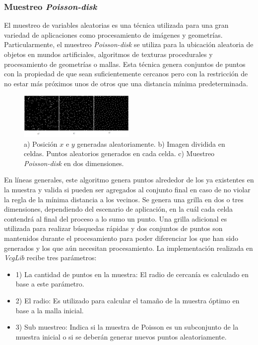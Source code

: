 \subsubsection{Muestreo \emph{Poisson-disk}}

El muestreo de variables aleatorias es una técnica utilizada para una gran variedad de aplicaciones como procesamiento de imágenes y geometrías. Particularmente, el muestreo \emph{Poisson-disk} se utiliza para la ubicación aleatoria de objetos en mundos artificiales, algoritmos de texturas procedurales y procesamiento de geometrías o mallas. Esta técnica genera conjuntos de puntos con la propiedad de que sean suficientemente cercanos pero con la restricción de no estar más próximos unos de otros que una distancia mínima predeterminada.

\begin{figure}[H]
  \centering
    \includegraphics[width=0.5\textwidth]{./Cap2_videomapping/malla-poisson.png}
  \caption{a) Posición $x$ e $y$ generadas aleatoriamente. b) Imagen dividida en celdas. Puntos aleatorios generados en cada celda. c) Muestreo \emph{Poisson-disk} en dos dimensiones.}
  \label{fig:Mesh-Poisson}
\end{figure}

En líneas generales, este algoritmo genera puntos alrededor de los ya existentes en la muestra y valida si pueden ser agregados al conjunto final en caso de no violar la regla de la mínima distancia a los vecinos. Se genera una grilla en dos o tres dimensiones, dependiendo del escenario de aplicación, en la cuál cada celda contendrá al final del proceso a lo sumo un punto. Una grilla adicional es utilizada para realizar búsquedas rápidas y dos conjuntos de puntos son mantenidos durante el procesamiento para poder diferenciar los que han sido generados y los que aún necesitan procesamiento.
La implementación realizada en \emph{VcgLib} recibe tres parámetros:
\begin{itemize}
  \item 1) La cantidad de puntos en la muestra: El radio de cercanía es calculado en base a este parámetro.
  \item 2) El radio: Es utilizado para calcular el tamaño de la muestra óptimo en base a la malla inicial.
  \item 3) Sub muestreo: Indica si la muestra de Poisson es un subconjunto de la muestra inicial o si se deberán generar nuevos puntos aleatoriamente.
\end{itemize}

